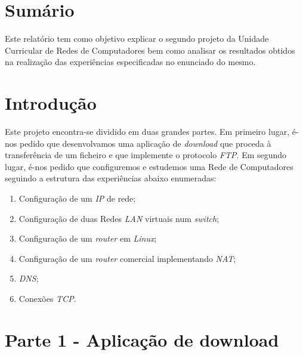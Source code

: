 \documentclass[a4paper]{article}
\begin{document}
	\maketitle
	\thispagestyle{empty}

	\newpage

	\section{Sumário}
	\normalsize

Este relatório tem como objetivo explicar o segundo projeto da Unidade Curricular de Redes de Computadores bem como analisar os resultados obtidos na realização das experiências especificadas no enunciado do mesmo.

	\newpage

	\tableofcontents	

	\newpage

	\section{Introdução}

	Este projeto encontra-se dividido em duas grandes partes. Em primeiro lugar, é-nos pedido que desenvolvamos uma aplicação de \textit{download} que proceda à transferência de um ficheiro e que implemente o protocolo \textit{FTP}. Em segundo lugar, é-nos pedido que configuremos e estudemos uma Rede de Computadores seguindo a estrutura das experiências abaixo enumeradas:

\begin{enumerate}

\item Configuração de um \textit{IP} de rede;
\item Configuração de duas Redes \textit{LAN} virtuais num \textit{switch};
\item Configuração de um \textit{router} em \textit{Linux};
\item Configuração de um \textit{router} comercial implementando \textit{NAT};
\item \textit{DNS};
\item Conexões \textit{TCP}.

\end{enumerate}

	\section{Parte 1 - Aplicação de download}
\end{document}
